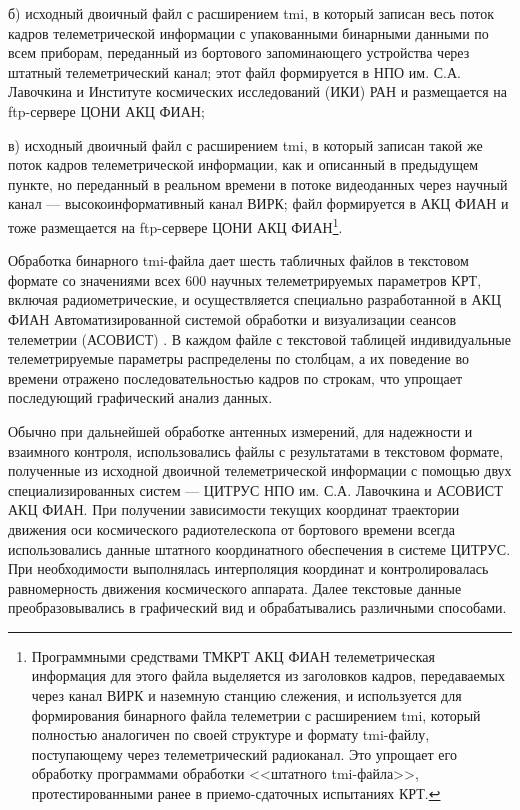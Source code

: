 б) исходный двоичный файл с расширением tmi, в который записан
весь поток кадров телеметрической информации с упакованными бинарными
данными по всем приборам, переданный из бортового запоминающего
устройства через штатный телеметрический канал;
этот файл формируется в НПО им. С.А. Лавочкина и
Институте космических исследований (ИКИ) РАН и
размещается на ftp-сервере ЦОНИ АКЦ ФИАН;

в) исходный двоичный файл с расширением tmi, в который записан
такой же поток кадров телеметрической информации, как и описанный в
предыдущем пункте, но переданный в реальном времени в потоке видеоданных
через научный канал --- высокоинформативный канал ВИРК;
файл формируется в АКЦ ФИАН и тоже размещается на ftp-сервере
ЦОНИ АКЦ ФИАН\footnote
{
Программными средствами ТМКРТ АКЦ ФИАН телеметрическая информация
для этого файла выделяется из заголовков кадров, передаваемых
через канал ВИРК и наземную станцию слежения, и используется для формирования
бинарного файла телеметрии с расширением tmi, который полностью аналогичен
по своей структуре и формату tmi-файлу, поступающему через телеметрический
радиоканал. Это упрощает его обработку программами обработки
<<штатного tmi-файла>>, протестированными ранее в приемо-сдаточных
испытаниях КРТ.
}.

Обработка бинарного tmi-файла дает шесть табличных файлов в текстовом формате со значениями всех 600
научных телеметрируемых параметров КРТ, включая радиометрические, и осуществляется специально
разработанной в АКЦ ФИАН Автоматизированной системой обработки и визуализации сеансов телеметрии
(АСОВИСТ)  \cite{KovalevVAK_2010}. В каждом файле с текстовой таблицей индивидуальные
телеметрируемые параметры распределены по столбцам, а их поведение во времени отражено
последовательностью кадров по строкам, что упрощает последующий графический анализ данных.

Обычно при дальнейшей обработке антенных измерений, для надежности и взаимного контроля,
использовались файлы с результатами в текстовом формате, полученные из исходной двоичной
телеметрической информации с помощью двух специализированных систем --- ЦИТРУС НПО им. С.А.
Лавочкина и АСОВИСТ АКЦ ФИАН. При получении зависимости текущих координат траектории движения оси
космического радиотелескопа от бортового времени всегда использовались данные штатного координатного
обеспечения в системе ЦИТРУС. При необходимости выполнялась интерполяция координат и
контролировалась равномерность движения космического аппарата. Далее текстовые данные
преобразовывались в графический вид и обрабатывались различными способами.

